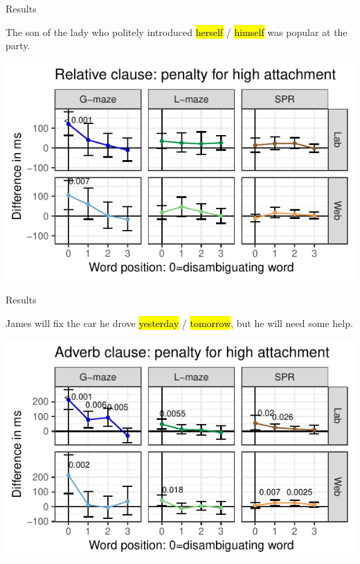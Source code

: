 \documentclass[12pt, xcolor=beamer,table,dvipsnames, ignorenonframetext, ngerman]{beamer}
\makeatletter
\let\HL\hl
\renewcommand\hl{%
	\let\set@color\beamerorig@set@color
	\let\reset@color\beamerorig@reset@color
	\HL}
\makeatother
\begin{document}
\begin{frame}{Results}
\begin{small}	
The son of the lady who politely introduced \hl{herself} / \hl{himself} was popular at the party.
	
\end{small}
\includegraphics[width=\textwidth]{g_rel.pdf}
\end{frame}

\begin{frame}{Results}
\begin{small}	

James will fix the car he drove \hl{yesterday} / \hl{tomorrow},  but he will need some help.

\end{small}
\includegraphics[width=\textwidth]{g_adv.pdf}
\end{frame}
\end{document}
